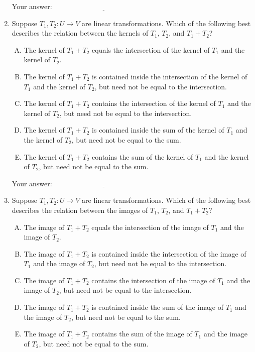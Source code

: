 \documentclass[10pt]{amsart}
\begin{document}
\begin{enumerate}
  \vspace{0.1in}
  Your answer: $\underline{\qquad\qquad\qquad\qquad\qquad\qquad\qquad}$
  \vspace{0.1in}

\item Suppose $T_1, T_2: U \to V$ are linear transformations. Which of
  the following best describes the relation between the kernels of
  $T_1$, $T_2$, and $T_1 + T_2$?

  \begin{enumerate}[(A)]
  \item The kernel of $T_1 + T_2$ equals the intersection of the
    kernel of $T_1$ and the kernel of $T_2$.
  \item The kernel of $T_1 + T_2$ is contained inside the intersection
    of the kernel of $T_1$ and the kernel of $T_2$, but need not be
    equal to the intersection.
  \item The kernel of $T_1 + T_2$ contains the intersection of the
    kernel of $T_1$ and the kernel of $T_2$, but need not be equal to
    the intersection.
  \item The kernel of $T_1 + T_2$ is contained inside the sum of the
    kernel of $T_1$ and the kernel of $T_2$, but need not be equal to
    the sum.
  \item The kernel of $T_1 + T_2$ contains the sum of the kernel of
    $T_1$ and the kernel of $T_2$, but need not be equal to the sum.
  \end{enumerate}

  \vspace{0.1in}
  Your answer: $\underline{\qquad\qquad\qquad\qquad\qquad\qquad\qquad}$
  \vspace{0.1in}

\item Suppose $T_1, T_2: U \to V$ are linear transformations. Which of
  the following best describes the relation between the images of
  $T_1$, $T_2$, and $T_1 + T_2$?

  \begin{enumerate}[(A)]
  \item The image of $T_1 + T_2$ equals the intersection of the
    image of $T_1$ and the image of $T_2$.
  \item The image of $T_1 + T_2$ is contained inside the intersection
    of the image of $T_1$ and the image of $T_2$, but need not be
    equal to the intersection.
  \item The image of $T_1 + T_2$ contains the intersection of the
    image of $T_1$ and the image of $T_2$, but need not be equal to
    the intersection.
  \item The image of $T_1 + T_2$ is contained inside the sum of the
    image of $T_1$ and the image of $T_2$, but need not be equal to
    the sum.
  \item The image of $T_1 + T_2$ contains the sum of the image of
    $T_1$ and the image of $T_2$, but need not be equal to the sum.
  \end{enumerate}


\end{enumerate}
\end{document}
